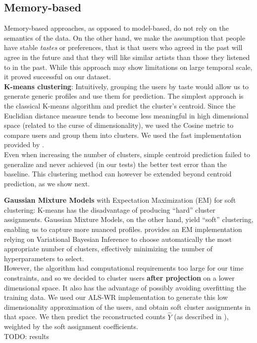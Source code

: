 \documentclass[10pt,a4paper]{article}
\begin{document}
  \subsection{Memory-based}
  Memory-based approaches, as opposed to model-based, do not rely on the semantics of the data. On the other hand, we make the assumption that people have stable \textit{tastes} or preferences, that is that users who agreed in the past will agree in the future and that they will like similar artists than those they listened to in the past. While this approach may show limitations on large temporal scale, it proved successful on our dataset.\\

    \noindent
    \textbf{K-means clustering}: Intuitively, grouping the users by taste would allow us to generate generic profiles and use them for prediction. The simplest approach is the classical K-means algorithm and predict the cluster's centroid. Since the Euclidian distance measure tends to become less meaningful in high dimensional space (related to the curse of dimensionality), we used the Cosine metric to compare users and group them into clusters. We used the fast implementation provided by \cite{piotrtoolbox}.\\
    Even when increasing the number of clusters, simple centroid prediction failed to generalize and never achieved (in our tests) the better test error than the baseline. This clustering method can however be extended beyond centroid prediction, as we show next.

    \noindent
    \textbf{Gaussian Mixture Models} with Expectation Maximization (EM) for soft clustering: K-means has the disadvantage of producing ``hard'' cluster assignments. Gaussian Mixture Models, on the other hand, yield ``soft'' clustering, enabling us to capture more nuanced profiles. \cite{gaussian-mixture-model-script} provides an EM implementation relying on Variational Bayesian Inference to choose automatically the most appropriate number of clusters, effectively minimizing the number of hyperparameters to select.\\
    However, the algorithm had computational requirements too large for our time constraints, and so we decided to cluster users \textbf{after projection} on a lower dimensional space. It also has the advantage of possibly avoiding overfitting the training data. We used our ALS-WR implementation to generate this low dimensionality approximation of the users, and obtain soft cluster assignments in that space. We then predict the reconstructed counts $\hat Y$ (as described in \cite{alswr}), weighted by the soft assignment coefficients.\\
    TODO: results
\end{document}
